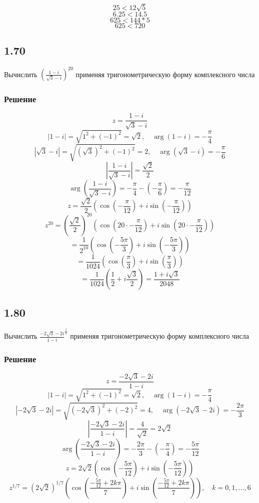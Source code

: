 \documentclass[12pt,a4paper]{article}
\begin{document}
\[
25 < 12\sqrt{5}
\]
\[
6.25 < 14.5
\]
\[
625 < 144*5
\]
\[
625 < 720
\]




\subsection*{1.70}
Вычислить $(\frac{1-i}{\sqrt{3}-i})^{20}$ применяя тригонометрическую форму комплексного числа 


\subsubsection*{Решение}
\[
z = \frac{1-i}{\sqrt{3}-i}
\]
\[
|1-i| = \sqrt{1^2 + (-1)^2} = \sqrt{2}, \quad \arg(1-i) = -\frac{\pi}{4}
\]
\[
|\sqrt{3} - i| = \sqrt{(\sqrt{3})^2 + (-1)^2} = 2, \quad \arg(\sqrt{3} - i) = -\frac{\pi}{6}
\]
\[
\left| \frac{1-i}{\sqrt{3}-i} \right| = \frac{\sqrt{2}}{2}
\]
\[
\arg\left( \frac{1-i}{\sqrt{3}-i} \right) = -\frac{\pi}{4} - (-\frac{\pi}{6}) = -\frac{\pi}{12}
\]
\[
z = \frac{\sqrt{2}}{2} \left( \cos\left(-\frac{\pi}{12}\right) + i \sin\left(-\frac{\pi}{12}\right) \right)
\]
\[
z^{20} = \left(\frac{\sqrt{2}}{2}\right)^{20} \left( \cos\left(20 \cdot -\frac{\pi}{12}\right) + i \sin\left(20 \cdot -\frac{\pi}{12}\right) \right)
\]
\[
= \frac{1}{2^{10}} \left( \cos\left(-\frac{5\pi}{3}\right) + i \sin\left(-\frac{5\pi}{3}\right) \right)
\]
\[
= \frac{1}{1024} \left( \cos\left(\frac{\pi}{3}\right) + i \sin\left(\frac{\pi}{3}\right) \right)
\]
\[
= \frac{1}{1024} \left( \frac{1}{2} + i \frac{\sqrt{3}}{2} \right)=\frac{1+i\sqrt{3}}{2048}
\]



\subsection*{1.80}
Вычислить $\frac{-2\sqrt{3} - 2i}{1 - i}^{\frac{1}{7}}$ применяя тригонометрическую форму комплексного числа 


\subsubsection*{Решение}
\[
z = \frac{-2\sqrt{3} - 2i}{1 - i}
\]
\[
|1 - i| = \sqrt{1^2 + (-1)^2} = \sqrt{2}, \quad \arg(1-i) = -\frac{\pi}{4}
\]
\[
|-2\sqrt{3} - 2i| = \sqrt{(-2\sqrt{3})^2 + (-2)^2} = 4, \quad \arg(-2\sqrt{3} - 2i) = -\frac{2\pi}{3}
\]
\[
\left| \frac{-2\sqrt{3} - 2i}{1 - i} \right| = \frac{4}{\sqrt{2}} = 2\sqrt{2}
\]
\[
\arg\left( \frac{-2\sqrt{3} - 2i}{1 - i} \right) = -\frac{2\pi}{3} - (-\frac{\pi}{4}) = -\frac{5\pi}{12}
\]
\[
z = 2\sqrt{2} \left( \cos\left(-\frac{5\pi}{12}\right) + i \sin\left(-\frac{5\pi}{12}\right) \right)
\]
\[
z^{1/7} = \left(2\sqrt{2}\right)^{1/7} \left( \cos\left(\frac{-\frac{5\pi}{12} + 2k\pi}{7}\right) + i \sin\left(\frac{-\frac{5\pi}{12} + 2k\pi}{7}\right) \right), \quad k = 0, 1, \dots, 6
\]
\end{document}
